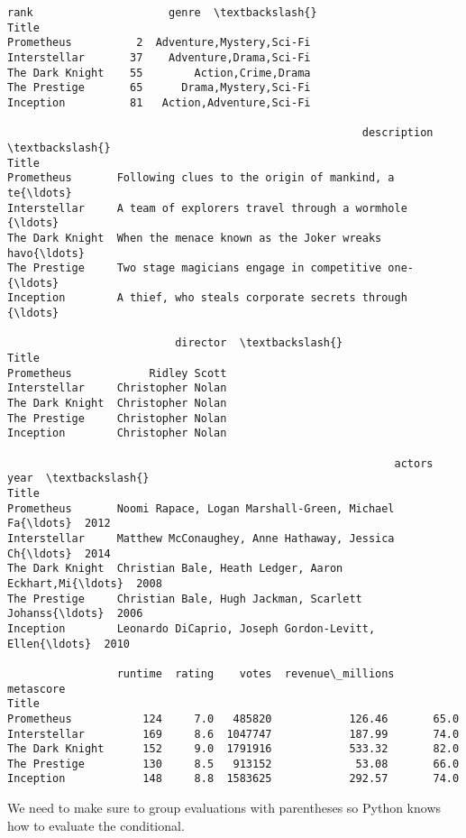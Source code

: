 \documentclass[11pt]{article}
\makeatletter
\newcommand{\boxspacing}{\kern\kvtcb@left@rule\kern\kvtcb@boxsep}
\newcommand{\prompt}[4]{
        {\ttfamily\llap{{\color{#2}[#3]:\hspace{3pt}#4}}\vspace{-\baselineskip}}
    }
\makeatother
\begin{document}
            \begin{tcolorbox}[breakable, size=fbox, boxrule=.5pt, pad at break*=1mm, opacityfill=0]
\prompt{Out}{outcolor}{47}{\boxspacing}
\begin{Verbatim}[commandchars=\\\{\}]
                 rank                     genre  \textbackslash{}
Title
Prometheus          2  Adventure,Mystery,Sci-Fi
Interstellar       37    Adventure,Drama,Sci-Fi
The Dark Knight    55        Action,Crime,Drama
The Prestige       65      Drama,Mystery,Sci-Fi
Inception          81   Action,Adventure,Sci-Fi

                                                       description  \textbackslash{}
Title
Prometheus       Following clues to the origin of mankind, a te{\ldots}
Interstellar     A team of explorers travel through a wormhole {\ldots}
The Dark Knight  When the menace known as the Joker wreaks havo{\ldots}
The Prestige     Two stage magicians engage in competitive one-{\ldots}
Inception        A thief, who steals corporate secrets through {\ldots}

                          director  \textbackslash{}
Title
Prometheus            Ridley Scott
Interstellar     Christopher Nolan
The Dark Knight  Christopher Nolan
The Prestige     Christopher Nolan
Inception        Christopher Nolan

                                                            actors  year  \textbackslash{}
Title
Prometheus       Noomi Rapace, Logan Marshall-Green, Michael Fa{\ldots}  2012
Interstellar     Matthew McConaughey, Anne Hathaway, Jessica Ch{\ldots}  2014
The Dark Knight  Christian Bale, Heath Ledger, Aaron Eckhart,Mi{\ldots}  2008
The Prestige     Christian Bale, Hugh Jackman, Scarlett Johanss{\ldots}  2006
Inception        Leonardo DiCaprio, Joseph Gordon-Levitt, Ellen{\ldots}  2010

                 runtime  rating    votes  revenue\_millions  metascore
Title
Prometheus           124     7.0   485820            126.46       65.0
Interstellar         169     8.6  1047747            187.99       74.0
The Dark Knight      152     9.0  1791916            533.32       82.0
The Prestige         130     8.5   913152             53.08       66.0
Inception            148     8.8  1583625            292.57       74.0
\end{Verbatim}
\end{tcolorbox}
        
    We need to make sure to group evaluations with parentheses so Python
knows how to evaluate the conditional.
\end{document}

